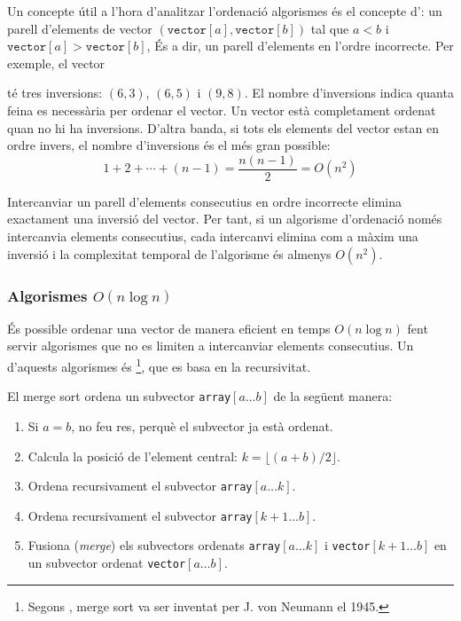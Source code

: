 Un concepte útil a l'hora d'analitzar l'ordenació
algorismes és el concepte d':
un parell d'elements de vector
$(\texttt{vector}[a],\texttt{vector}[b])$ tal que
$a<b$ i $\texttt{vector}[a]>\texttt{vector}[b]$,
És a dir, un parell d'elements en l'ordre incorrecte.
Per exemple, el vector
\begin{centre}
\end{centre}
té tres inversions: $(6,3)$, $(6,5)$ i $(9,8)$.
El nombre d'inversions indica
quanta feina es necessària per ordenar el vector.
Un vector està completament ordenat quan
no hi ha inversions.
D'altra banda, si tots els elements del vector
estan en ordre invers,
el nombre d'inversions és el més gran possible:
\[1+2+\cdots+(n-1)=\frac{n(n-1)}{2} = O(n^2)\]

Intercanviar un parell d'elements consecutius en
ordre incorrecte elimina exactament una inversió
del vector.
Per tant, si un algorisme d'ordenació només
intercanvia elements consecutius, cada intercanvi elimina
com a màxim una inversió i la complexitat temporal
de l'algorisme és almenys $O(n^2)$.

\subsubsection{Algorismes $O(n \log n)$}


És possible ordenar una vector de manera eficient
en temps $O(n \log n)$ fent servir algorismes
que no es limiten a intercanviar elements consecutius.
Un d'aquests algorismes és \footnote{Segons \cite{knu983},
merge sort va ser inventat per J. von Neumann el 1945.},
que es basa en la recursivitat.

El merge sort ordena un subvector \texttt{array}$[a \ldots b]$ de la següent manera:

\begin{enumerate}
\item Si $a=b$, no feu res, perquè el subvector ja està ordenat.
\item Calcula la posició de l'element central: $k=\lfloor (a+b)/2 \rfloor$.
\item Ordena recursivament el subvector \texttt{array}$[a \ldots k]$.
\item Ordena recursivament el subvector \texttt{array}$[k+1 \ldots b]$.
\item Fusiona (\emph{merge}) els subvectors ordenats \texttt{array}$[a \ldots k]$ i
\texttt{vector}$[k+1 \ldots b]$
en un subvector ordenat \texttt{vector}$[a \ldots b]$.
\end{enumerate}

